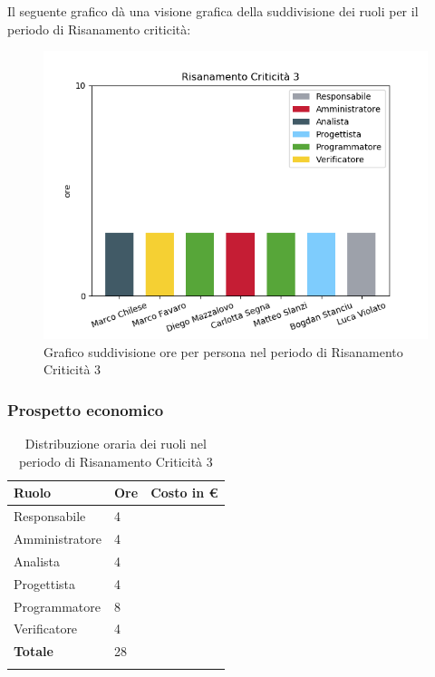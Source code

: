 Il seguente grafico dà una visione grafica della suddivisione dei ruoli per il periodo di Risanamento criticità:\begin{figure}[H]
	\centering
	\includegraphics[width=1\linewidth]{./images/fig_rc3.png}
	\caption{Grafico suddivisione ore per persona nel periodo di Risanamento Criticità 3}
	\label{fig:grafico suddivione ruoli rc3}
\end{figure}

\subsubsection{Prospetto economico}
\begin{longtable}{| C{.30\textwidth}| C{.15\textwidth}| C{.20\textwidth}|}
	\hline
	\textbf{Ruolo} & \textbf{Ore} & \textbf{Costo in \euro} \\
	\hline 
	Responsabile & 4 &  \\
	\hline
	Amministratore & 4 &  \\
	\hline
	Analista & 4 &  \\
	\hline
	Progettista & 4 & \\
	\hline
	Programmatore & 8 &  \\
	\hline 
	Verificatore & 4 &  \\
	\hline
	\textbf{Totale} & 28 &  \\
	\hline 


\caption{Distribuzione oraria dei ruoli nel periodo di Risanamento Criticità 3}
\label{Distribuzione oraria rc3}
\end{longtable}

